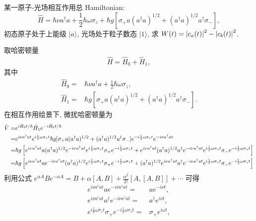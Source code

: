 \documentclass{assignment}
\begin{document}
\begin{prob}
    某一原子-光场相互作用总 Hamiltonian:
    \[
        \hat{H}=\hbar\nu a^{\dagger}a+\frac{1}{2}\hbar\omega\sigma_z+\hbar g[\sigma_+a(a^{\dagger}a)^{1/2}+(a^{\dagger}a)^{1/2}a^{\dagger}\sigma_-],
    \]
    初态原子处于上能级 $\lvert a\rangle$, 光场处于粒子数态 $\lvert 1\rangle$, 求 $W(t)=\left\lvert c_a(t)\right\rvert^2-\left\lvert c_b(t)\right\rvert^2$.
\end{prob}
\begin{sol}
    取哈密顿量
    \begin{align}
        \hat{H}=\hat{H}_0+\hat{H}_1,
    \end{align}
    其中
    \begin{align}
        \hat{H}_0=&\hbar\nu a^{\dagger}a+\frac{1}{2}\hbar\omega\sigma_z,\\
        \hat{H}_1=&\hbar g[\sigma_+a(a^{\dagger}a)^{1/2}+(a^{\dagger}a)^{1/2}a^{\dagger}\sigma_-].
    \end{align}
    在相互作用绘景下, 微扰哈密顿量为
    \begin{align}
        \notag\hat{V}=&e^{i\hat{H}_0t/\hbar}\hat{H}_1e^{-i\hat{H}_0t/\hbar}\\
        \notag=&e^{i\nu a^{\dagger}at}e^{i\frac{1}{2}\omega\sigma_zt}\hbar g[\sigma_+a(a^{\dagger}a)^{1/2}+(a^{\dagger}a)^{1/2}a^{\dagger}\sigma_-]e^{-i\frac{1}{2}\omega\sigma_zt}e^{-i\nu a^{\dagger}at}\\
        \notag=&\hbar g\left[e^{i\nu a^{\dagger}at}a(a^{\dagger}a)^{1/2}e^{-i\nu a^{\dagger}at}e^{i\frac{1}{2}\omega\sigma_zt}\sigma_+e^{-i\frac{1}{2}\omega\sigma_zt}+e^{i\nu a^{\dagger}at}(a^{\dagger}a)^{1/2}a^{\dagger}e^{-i\nu a^{\dagger}at}e^{i\frac{1}{2}\omega\sigma_zt}\sigma_-e^{-i\frac{1}{2}\omega\sigma_zt}\right]\\
        =&\hbar g\left[e^{i\nu a^{\dagger}at}ae^{-i\nu a^{\dagger}at}(a^{\dagger}a)^{1/2}e^{i\frac{1}{2}\omega\sigma_zt}\sigma_+e^{-i\frac{1}{2}\omega\sigma_zt}+(a^{\dagger}a)^{1/2}e^{i\nu a^{\dagger}at}a^{\dagger}e^{-i\nu a^{\dagger}at}e^{i\frac{1}{2}\omega\sigma_zt}\sigma_-e^{-i\frac{1}{2}\omega\sigma_zt}\right]
    \end{align}
    利用公式 $e^{\alpha A}Be^{-\alpha A}=B+\alpha[A,B]+\frac{\alpha^2}{2!}[A,[A,B]]+\cdots$ 可得
    \begin{align}
        e^{i\nu a^{\dagger}at}ae^{-i\nu a^{\dagger}at}=&ae^{-i\nu t},\\
        e^{i\nu a^{\dagger}at}a^{\dagger}e^{-i\nu a^{\dagger}at}=&a^{\dagger}e^{i\nu t},\\
        e^{i\frac{1}{2}\omega\sigma_zt}\sigma_+e^{-i\frac{1}{2}\omega\sigma_zt}=&\sigma_+e^{i\omega t},\\

\end{align}
\end{sol}
\end{document}
